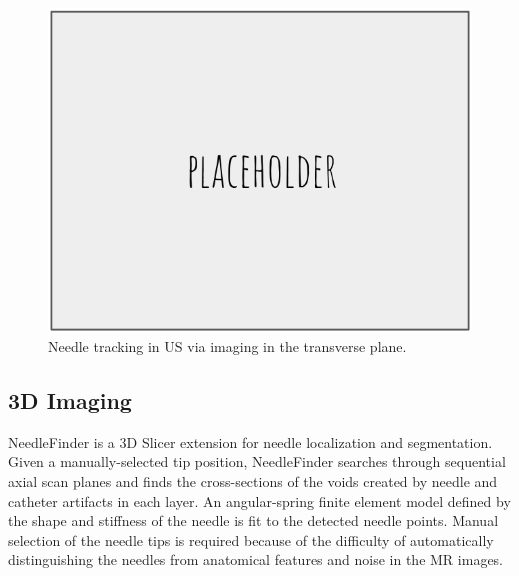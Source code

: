 \begin{figure}[h]
\includegraphics[width=1.0\textwidth]{Fig/placeholder.png}
\caption{Needle tracking in US via imaging in the transverse plane\cite{vrooijink_real-time_2013}.}
\label{fig:transverse_planes_us}
\end{figure}

\subsection{3D Imaging}
NeedleFinder is a 3D Slicer extension for needle localization and segmentation\cite{pernelle_validation_2013}. Given a manually-selected tip position, NeedleFinder searches through sequential axial scan planes and finds the cross-sections of the voids created by needle and catheter artifacts in each layer. An angular-spring finite element model defined by the shape and stiffness of the needle is fit to the detected needle points. Manual selection of the needle tips is required because of the difficulty of automatically distinguishing the needles from anatomical features and noise in the MR images.

